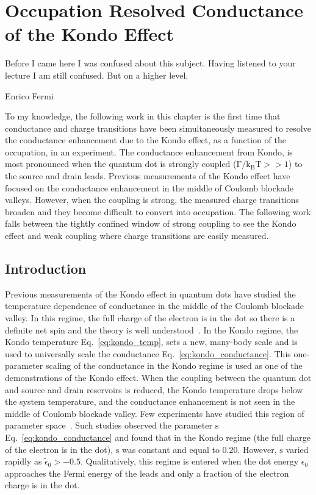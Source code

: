 \chapter[Occupation Resolved Conductance of the Kondo Effect]{Occupation Resolved Conductance of the Kondo Effect}\label{cha:mixed_valence_conductance}

\epigraph{Before I came here I was confused about this subject. Having listened to your lecture I am still confused. But on a higher level.}{Enrico Fermi}

To my knowledge, the following work in this chapter is the first time that conductance and charge transitions have been simultaneously measured to resolve the conductance enhancement due to the Kondo effect, as a function of the occupation, in an experiment. The conductance enhancement from Kondo, is most pronounced when the quantum dot is strongly coupled ($\mathrm{\Gamma/k_BT}>>1$) to the source and drain leads. Previous measurements of the Kondo effect have focused on the conductance enhancement in the middle of Coulomb blockade valleys. However, when the coupling is strong, the measured charge transitions broaden and they become difficult to convert into occupation. The following work falls between the tightly confined window of strong coupling to see the Kondo effect and weak coupling where charge transitions are easily measured. 

\section{Introduction}
Previous measurements of the Kondo effect in quantum dots have studied the temperature dependence of conductance in the middle of the Coulomb blockade valley. In this regime, the full charge of the electron is in the dot so there is a definite net spin and the theory is well understood~\cite{kondo_unitary, costi_kondo_mv_eo_regime}. In the Kondo regime, the Kondo temperature Eq.~\ref{eq:kondo_temp}, sets a new, many-body scale and is used to universally scale the conductance Eq.~\ref{eq:kondo_conductance}. This one-parameter scaling of the conductance in the Kondo regime is used as one of the demonstrations of the Kondo effect. When the coupling between the quantum dot and source and drain reservoirs is reduced, the Kondo temperature drops below the system temperature, and the conductance enhancement is not seen in the middle of Coulomb blockade valley. Few experiments have studied this region of parameter space~\cite{goldhaber_mv}. Such studies observed the parameter $\mathrm{s}$ Eq.~\ref{eq:kondo_conductance} and found that in the Kondo regime (the full charge of the electron is in the dot), $\mathrm{s}$ was constant and equal to $0.20$. However, $\mathrm{s}$ varied rapidly as $\tilde{\epsilon}_0>-0.5$. Qualitatively, this regime is entered when the dot energy $\epsilon_0$ approaches the Fermi energy of the leads and only a fraction of the electron charge is in the dot. 


